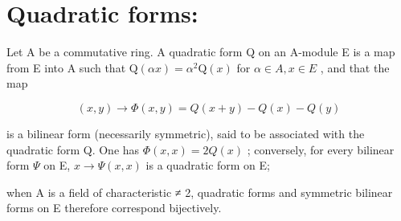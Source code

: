 \section*{Quadratic forms:}

Let A be a commutative ring. A quadratic form Q on an A-module E is a map from E into A such that \(\mathrm{Q}(\alpha x) = \alpha^{2}\mathrm{Q}(x)\) for \(\alpha \in A, x \in E\) , and that the map

\[
(x, y) \rightarrow \Phi (x, y) = Q (x + y) - Q (x) - Q (y)
\]

is a bilinear form (necessarily symmetric), said to be associated with the quadratic form Q. One has \(\Phi(x, x) = 2Q(x)\) ; conversely, for every bilinear form \(\Psi\) on E, \(x \to \Psi(x, x)\) is a quadratic form on E;

when A is a field of characteristic ≠ 2, quadratic forms and symmetric bilinear forms on E therefore correspond bijectively.

